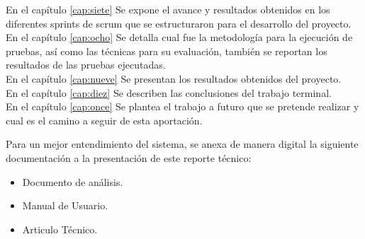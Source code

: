 En el capítulo  \ref{cap:siete} Se expone el avance y resultados obtenidos en los diferentes sprints de scrum que se estructuraron para el desarrollo del proyecto. \\

En el capítulo  \ref{cap:ocho} Se detalla cual fue la metodología para la ejecución de pruebas, así como las técnicas para su evaluación, también se reportan los resultados de las pruebas ejecutadas.\\

En el capítulo \ref{cap:nueve} Se presentan los resultados obtenidos del proyecto.\\

En el capítulo \ref{cap:diez} Se describen las conclusiones del trabajo terminal.\\ 

En el capítulo \ref{cap:once} Se plantea el trabajo a futuro que se pretende realizar y cual es el camino a seguir de esta aportación.\\

\vspace*{0.3in}

Para un mejor entendimiento del sistema, se anexa de manera digital la siguiente documentación a la presentación de este reporte técnico:

\begin{itemize}
	\item Documento de análisis.
	\item Manual de Usuario.
	\item Articulo Técnico.
\end{itemize}
